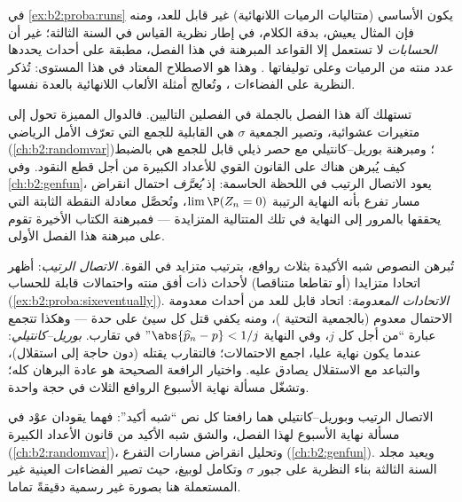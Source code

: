 \begin{remark}
في \cref{ex:b2:proba:runs} يكون  الأساسي (متتاليات الرميات اللانهائية)
غير قابل للعد، ومنه فإن المثال يعيش، بدقة الكلام، في إطار نظرية
القياس في السنة الثالثة؛ غير أن \emph{الحسابات} لا تستعمل إلا القواعد
المبرهنة في هذا الفصل، مطبقة على أحداث يحددها عدد منته من الرميات
وعلى توليفاتها . وهذا هو الاصطلاح المعتاد في هذا المستوى:
تُذكر النظرية على الفضاءات ، وتُعالج أمثلة الألعاب
اللانهائية بالعدة نفسها.
\end{remark}

\begin{remark}
تستهلك آلة هذا الفصل بالجملة في الفصلين التاليين. فالدوال المميزة
تحول  إلى متغيرات عشوائية، وتصير الجمعية $\sigma$ هي القابلية
للجمع التي تعرّف الأمل الرياضي (\cref{ch:b2:randomvar})؛ ومبرهنة بوريل--كانتيلي مع
حصر ذيلي قابل للجمع هي بالضبط كيف يُبرهن هناك على القانون القوي
للأعداد الكبيرة من أجل قطع النقود. وفي \cref{ch:b2:genfun}، يعود الاتصال الرتيب
في اللحظة الحاسمة: إذ \emph{يُعرَّف} احتمال انقراض مسار تفرع بأنه
النهاية الرتيبة $\lim\P(Z_n = 0)$، وتُحصَّل معادلة النقطة الثابتة التي يحققها
بالمرور إلى النهاية في تلك المتتالية المتزايدة --- فمبرهنة الكتاب
الأخيرة تقوم على مبرهنة هذا الفصل الأولى.
\end{remark}

\begin{remark}
تُبرهن النصوص شبه الأكيدة بثلاث روافع، بترتيب متزايد في القوة.
\emph{الاتصال الرتيب}: أظهر  اتحادا متزايدا (أو تقاطعا
متناقصا) لأحداث ذات أفق منته واحتمالات قابلة للحساب (\cref{ex:b2:proba:sixeventually}).
\emph{الاتحادات المعدومة}: اتحاد قابل للعد من أحداث معدومة الاحتمال
معدوم (بالجمعية التحتية )، ومنه يكفي قتل كل  سيئ على
حدة --- وهكذا تتجمع عبارة ``من أجل كل $j$، وفي النهاية $\abs{\widehat p_n - p} < 1/j$''
في تقارب. \emph{بوريل--كانتيلي}: عندما يكون  نهاية عليا، اجمع
الاحتمالات؛ فالتقارب يقتله (دون حاجة إلى استقلال)، والتباعد مع
الاستقلال يصادق عليه. واختيار الرافعة الصحيحة هو عادة البرهان كله؛
وتشغّل مسألة نهاية الأسبوع الروافع الثلاث في حجة واحدة.
\end{remark}

\begin{remark}
الاتصال الرتيب وبوريل--كانتيلي هما رافعتا كل نص ``شبه أكيد'': فهما
يقودان عوْد  في مسألة نهاية الأسبوع لهذا الفصل، والشق
شبه الأكيد من قانون الأعداد الكبيرة (\cref{ch:b2:randomvar})، وتحليل انقراض مسارات
التفرع (\cref{ch:b2:genfun}). ويعيد مجلد السنة الثالثة بناء النظرية على جبور
$\sigma$ وتكامل لوبيغ، حيث تصير الفضاءات العينية غير 
المستعملة هنا بصورة غير رسمية دقيقةً تماما.
\end{remark}

